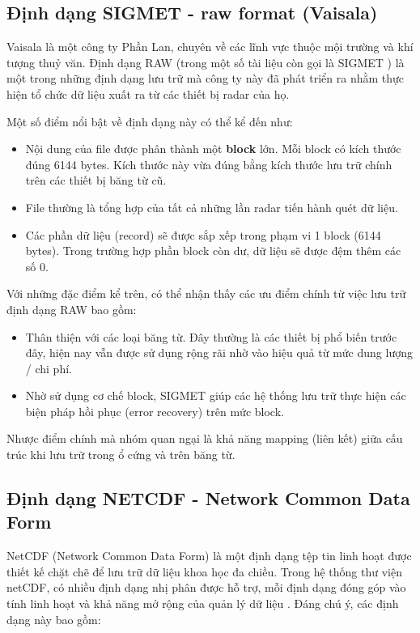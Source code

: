 \subsection{Định dạng SIGMET - raw format (Vaisala)}
\label{sigmet}
Vaisala là một công ty Phần Lan, chuyên về các lĩnh vực thuộc mội trường và khí tượng thuỷ văn. Định dạng RAW (trong một số tài liệu còn gọi là SIGMET \cite{lrose_RadxConvert}) là một trong những định dạng lưu trữ mà công ty này đã phát triển ra nhằm thực hiện tổ chức dữ liệu xuất ra từ các thiết bị radar của họ.

Một số điểm nổi bật về định dạng này có thể kể đến như:

\begin{itemize}
    \item Nội dung của file được phân thành một \textbf{block} lớn. Mỗi block có kích thước đúng 6144 bytes. Kích thước này vừa đúng bằng kích thước lưu trữ chính trên các thiết bị băng từ cũ.
    \item File thường là tổng hợp của tất cả những lần radar tiến hành quét dữ liệu.
    \item Các phần dữ liệu (record) sẽ được sắp xếp trong phạm vi 1 block (6144 bytes). Trong trường hợp phần block còn dư, dữ liệu sẽ được đệm thêm các số 0.
\end{itemize}

Với những đặc điểm kể trên, có thể nhận thấy các ưu điểm chính từ việc lưu trữ định dạng RAW bao gồm: \cite{raw_product_format_vaisala}

\begin{itemize}
    \item Thân thiện với các loại băng từ. Đây thường là các thiết bị phổ biến trước đây, hiện nay vẫn được sử dụng rộng rãi nhờ vào hiệu quả từ mức dung lượng / chi phí.
    \item Nhờ sử dụng cơ chế block, SIGMET giúp các hệ thống lưu trữ thực hiện các biện pháp hồi phục (error recovery) trên mức block.
\end{itemize}

Nhược điểm chính mà nhóm quan ngại là khả năng mapping (liên kết) giữa cấu trúc khi lưu trữ trong ổ cứng và trên băng từ.

\subsection{Định dạng NETCDF - Network Common Data Form}

NetCDF (Network Common Data Form) là một định dạng tệp tin linh hoạt được thiết kế chặt chẽ để lưu trữ dữ liệu khoa học đa chiều. Trong hệ thống thư viện netCDF, có nhiều định dạng nhị phân được hỗ trợ, mỗi định dạng đóng góp vào tính linh hoạt và khả năng mở rộng của quản lý dữ liệu \cite{netcdf}. Đáng chú ý, các định dạng này bao gồm:

